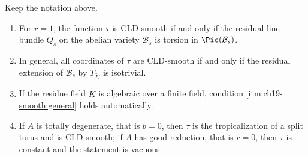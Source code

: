 \begin{proposition}
\label{prop:ch19-tau-smooth}
Keep the notation above.
\begin{enumerate}
\item\label{itm:ch19-smooth:rank1} For $r=1$, the function $\tau$ is
 CLD-smooth if and only if the residual line bundle $Q_s$ on the abelian
 variety $\mathcal B_s$ is torsion in $\Pic(\mathcal B_s)$.
\item\label{itm:ch19-smooth:general} In general, all coordinates of $\tau$
 are CLD-smooth if and only if the residual extension of $\mathcal B_s$ by
 $T_{\widetilde K}$ is isotrivial.
\item\label{itm:ch19-smooth:finite} If the residue field $\widetilde K$ is
 algebraic over a finite field, condition
 \cref{itm:ch19-smooth:general} holds automatically.
\item\label{itm:ch19-smooth:degenerate} If $A$ is totally degenerate,
 that is $b=0$, then $\tau$ is the tropicalization of a split torus and
 is CLD-smooth; if $A$ has good reduction, that is $r=0$, then $\tau$
 is constant and the statement is vacuous.
\end{enumerate}
\end{proposition}

